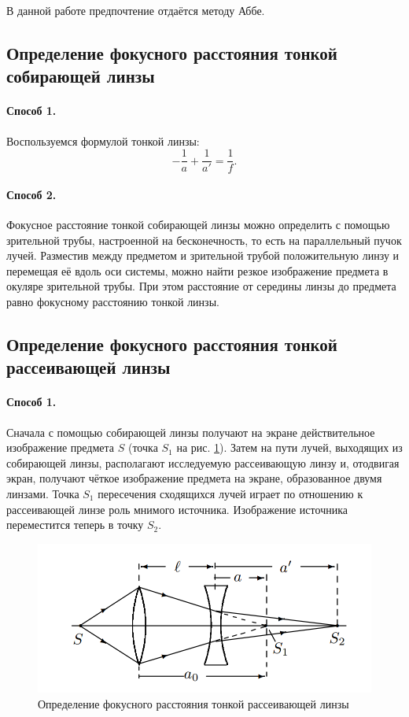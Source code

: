 \documentclass[a4paper]{article}
\newcommand{\picref}[1]{рис. \ref{#1}}
\begin{document}
В данной работе предпочтение отдаётся методу Аббе.

\subsection{Определение фокусного расстояния тонкой собирающей линзы}

\paragraph{Способ 1.} Воспользуемся формулой тонкой линзы:
\begin{equation}\label{thin-lens}
	-\frac{1}{a}+\frac{1}{a'} = \frac{1}{f}.
\end{equation}
\paragraph{Способ 2.}
Фокусное расстояние тонкой собирающей линзы можно определить с помощью зрительной трубы, настроенной на бесконечность, то есть на параллельный пучок лучей. Разместив между предметом и зрительной трубой положительную линзу и перемещая её вдоль оси системы, можно найти резкое изображение предмета в окуляре зрительной трубы. При этом расстояние от середины линзы до предмета равно фокусному расстоянию тонкой линзы.

\subsection{Определение фокусного расстояния тонкой рассеивающей линзы}

\paragraph{Способ 1.} Сначала с помощью собирающей линзы получают на экране действительное изображение предмета $ S $ (точка $ S_1 $ на \picref{4}). Затем на пути лучей, выходящих из собирающей линзы, располагают исследуемую рассеивающую линзу и, отодвигая экран, получают чёткое изображение предмета на экране, образованное двумя линзами. Точка $ S_1 $ пересечения сходящихся лучей играет по отношению к рассеивающей линзе роль мнимого источника. Изображение источника переместится теперь в точку $ S_2 $. 

\begin{figure}[tbp]
	\centering
	\includegraphics[width=0.8\linewidth]{Screenshot_5}
	\caption{Определение фокусного расстояния тонкой рассеивающей линзы}
	\label{4}
\end{figure}
\end{document}
